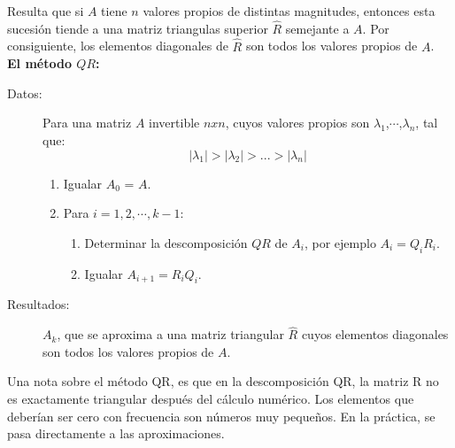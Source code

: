 Resulta que si $A$ tiene $n$ valores propios de distintas magnitudes, entonces esta sucesión tiende a una
matriz triangulas superior $\hat{R}$ semejante a $A$.
Por consiguiente, los elementos diagonales de $\hat{R}$ son todos los valores propios de $A$.\\

\textbf{El método $QR$:}
\begin{description}
	\item[Datos:] Para una matriz $A$ invertible $n x n$, cuyos valores propios son
	$\lambda_1$,$\cdots$,$\lambda_n$, tal que:
$$
		\lvert\lambda_1\rvert>\lvert\lambda_2\rvert>...>\lvert\lambda_n\rvert
$$
	\begin{enumerate}	
		\item Igualar $A_0$ = $A$.
		\item Para $i = 1,2,\cdots, k-1$:
		\begin{enumerate}
			\item Determinar la descomposición $QR$ de $A_i$, por ejemplo $A_i = Q_i R_i$.
			\item Igualar $A_{i+1} = R_iQ_i$.
		\end{enumerate}
	\end{enumerate}
	\item[Resultados:] $A_k$, que se aproxima a una matriz triangular $\hat{R}$ cuyos elementos diagonales
	son todos los valores propios de $A$.
\end{description}

Una nota sobre el método QR, es que en la descomposición QR, la matriz R no es exactamente triangular después del cálculo numérico. Los elementos que deberían ser cero con frecuencia son números muy pequeños. En la práctica, se pasa directamente a las aproximaciones.

